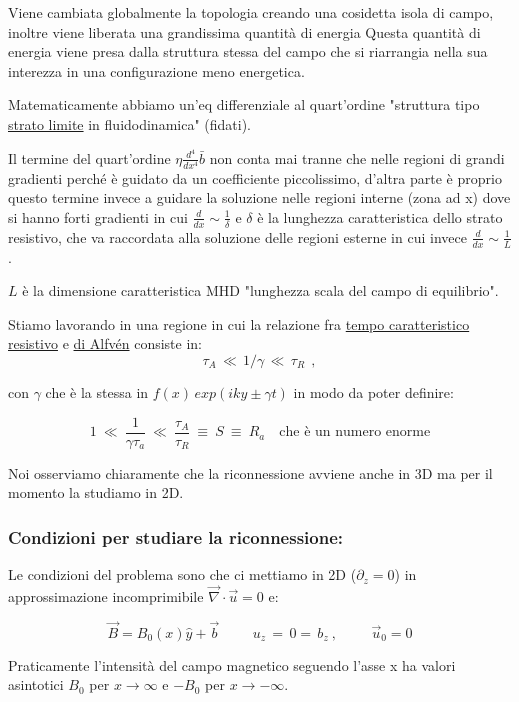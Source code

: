 Viene cambiata globalmente la topologia  creando una cosidetta isola di campo, inoltre viene liberata una grandissima quantità di energia Questa quantità di energia viene presa dalla struttura stessa del campo che si riarrangia nella sua interezza in una configurazione meno energetica.

Matematicamente abbiamo un'eq differenziale al quart'ordine "struttura tipo \underline{strato limite} in fluidodinamica" (fidati). 

Il termine del quart'ordine $\boxed{\eta\frac{d^4}{dx^4}\bar b}$ non conta mai tranne che nelle regioni di grandi gradienti perché è guidato da un coefficiente piccolissimo, d'altra parte è proprio questo termine invece a guidare la soluzione nelle regioni interne (zona ad x) dove si hanno forti gradienti in cui $\displaystyle\frac{d}{dx}\sim\frac{1}{\delta}$ e $\delta$ è la lunghezza caratteristica dello strato resistivo,  che va raccordata alla soluzione delle regioni esterne in cui invece $\frac{d}{dx}\sim\frac{1}{L}$.

$L$ è la dimensione caratteristica MHD "lunghezza scala del campo di equilibrio". 

Stiamo lavorando in una regione in cui la relazione fra \underline{tempo caratteristico} \underline{resistivo} e \underline{di Alfvén} consiste in:
$$\tau_A\,\ll\, 1/\gamma\,\ll\,\tau_R\ \ ,$$ 

con $\gamma$ che è la stessa in $f(x)\, exp(i k y\pm \gamma t)$ in modo da poter definire:

\[1\ \ll\ \frac{1}{\gamma\tau_a}\ \ll\ \frac{\tau_A}{\tau_R}\ \equiv\  S\ \equiv\ R_a\quad \text{che è un numero enorme}\] 

Noi osserviamo chiaramente che la riconnessione avviene anche in 3D ma per il momento la studiamo in 2D.

\subsubsection{Condizioni per studiare la riconnessione:}

Le condizioni del problema sono che ci mettiamo in 2D ($\partial_z=0$) in approssimazione incomprimibile $\vec\nabla\cdot\vec u=0$ e: 

\[\vec B=B_0(x)\hat y+\vec b\hspace{1cm}u_z\,=\,0=\,b_z\ ,\hspace{1cm} \vec u_0=0\]


Praticamente l'intensità del campo magnetico seguendo l'asse x ha valori asintotici $B_0$ per $x\to\infty$ e $-B_0$ per $x\to-\infty$. 


